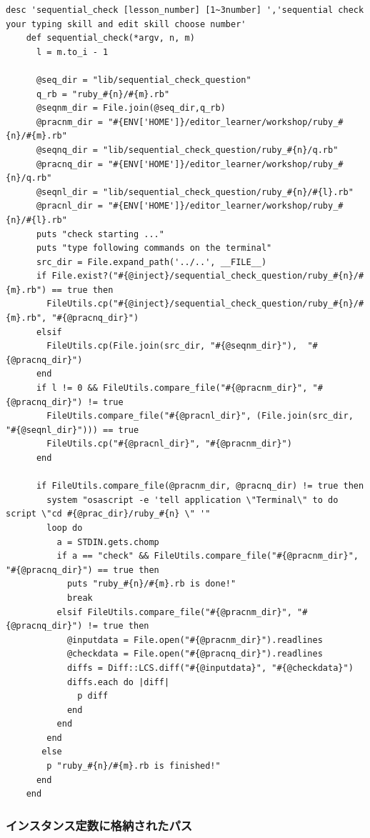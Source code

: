 \documentclass[11pt,dvipdfmx]{jsarticle}
\begin{document}
\begin{verbatim}
desc 'sequential_check [lesson_number] [1~3number] ','sequential check your typing skill and edit skill choose number'
    def sequential_check(*argv, n, m)
      l = m.to_i - 1
     
      @seq_dir = "lib/sequential_check_question"
      q_rb = "ruby_#{n}/#{m}.rb"
      @seqnm_dir = File.join(@seq_dir,q_rb)
      @pracnm_dir = "#{ENV['HOME']}/editor_learner/workshop/ruby_#{n}/#{m}.rb"
      @seqnq_dir = "lib/sequential_check_question/ruby_#{n}/q.rb"
      @pracnq_dir = "#{ENV['HOME']}/editor_learner/workshop/ruby_#{n}/q.rb"      
      @seqnl_dir = "lib/sequential_check_question/ruby_#{n}/#{l}.rb"
      @pracnl_dir = "#{ENV['HOME']}/editor_learner/workshop/ruby_#{n}/#{l}.rb"      
      puts "check starting ..."
      puts "type following commands on the terminal"
      src_dir = File.expand_path('../..', __FILE__)
      if File.exist?("#{@inject}/sequential_check_question/ruby_#{n}/#{m}.rb") == true then
        FileUtils.cp("#{@inject}/sequential_check_question/ruby_#{n}/#{m}.rb", "#{@pracnq_dir}")
      elsif
        FileUtils.cp(File.join(src_dir, "#{@seqnm_dir}"),  "#{@pracnq_dir}")
      end
      if l != 0 && FileUtils.compare_file("#{@pracnm_dir}", "#{@pracnq_dir}") != true
        FileUtils.compare_file("#{@pracnl_dir}", (File.join(src_dir, "#{@seqnl_dir}"))) == true
        FileUtils.cp("#{@pracnl_dir}", "#{@pracnm_dir}")
      end
      
      if FileUtils.compare_file(@pracnm_dir, @pracnq_dir) != true then
        system "osascript -e 'tell application \"Terminal\" to do script \"cd #{@prac_dir}/ruby_#{n} \" '"
        loop do
          a = STDIN.gets.chomp
          if a == "check" && FileUtils.compare_file("#{@pracnm_dir}", "#{@pracnq_dir}") == true then
            puts "ruby_#{n}/#{m}.rb is done!"
            break
          elsif FileUtils.compare_file("#{@pracnm_dir}", "#{@pracnq_dir}") != true then
            @inputdata = File.open("#{@pracnm_dir}").readlines
            @checkdata = File.open("#{@pracnq_dir}").readlines
            diffs = Diff::LCS.diff("#{@inputdata}", "#{@checkdata}")
            diffs.each do |diff|
              p diff
            end
          end
        end
       else
        p "ruby_#{n}/#{m}.rb is finished!"
      end
    end
\end{verbatim}

\subsubsection{インスタンス定数に格納されたパス}\label{ux30a4ux30f3ux30b9ux30bfux30f3ux30b9ux5b9aux6570ux306bux683cux7d0dux3055ux308cux305fux30d1ux30b9}
\end{document}
